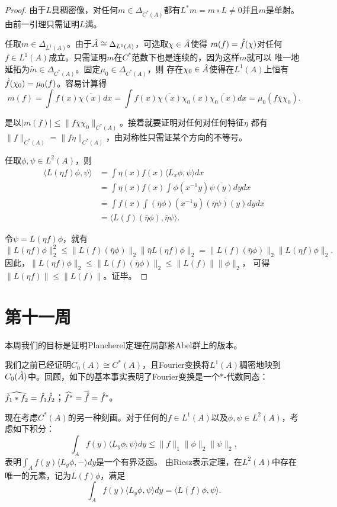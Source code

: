 \begin{proof}
    由于$L$具稠密像，对任何$m \in \Delta_{C^*(A)}$都有$L^*m = m \circ L \neq 0$并且$m$是单射。
    由前一引理只需证明$L$满。

    任取$m \in \Delta_{L^1(A)}$。由于$\hat{A} \cong \Delta_{L^1(A)}$，可选取$\chi \in \hat{A}$使得
    $m(f) = \hat{f}(\chi)$对任何$f \in L^1(A)$成立。只需证明$m$在$C^*$范数下也是连续的，因为这样$m$就可以
    唯一地延拓为$\tilde{m} \in \Delta_{C^*(A)}$。固定$\mu_0 \in \Delta_{C^*(A)}$，则
    存在$\chi_0 \in \hat{A}$使得在$L^1(A)$上恒有$\hat{f}(\chi_0) = \mu_0(f)$。容易计算得
    \[m(f) = \int f(x)\overline{\chi(x)} dx = \int f(x)\overline{\chi(x)}\chi_0(x)\overline{\chi_0(x)} dx = \mu_0(f\overline{\chi}\chi_0).\]

    是以$|m(f)| \leqslant \|f\overline{\chi}\chi_0\|_{C^*(A)}$。接着就要证明对任何对任何特征$\eta$
    都有$\|f\|_{C^*(A)} = \|f\eta\|_{C^*(A)}$，由对称性只需证某个方向的不等号。

    任取$\phi,\psi \in L^2(A)$，则
    \begin{align*}
        \langle L(\eta f)\phi,\psi \rangle & = \int \eta(x)f(x)\langle L_x\phi,\psi \rangle dx
        \\ & = \int \eta(x)f(x)\int \phi(x^{-1}y)\overline{\psi(y)}dydx
        \\ & = \int f(x)\int (\bar{\eta}\phi)(x^{-1}y)\overline{(\bar{\eta}\psi)(y)}dydx
        \\ & = \langle L(f)(\bar{\eta}\phi),\bar{\eta}\psi \rangle.
    \end{align*}

    令$\psi = L(\eta f)\phi$，就有
    \[\|L(\eta f)\phi\|_2^2 
    \leqslant \|L(f)(\bar{\eta}\phi)\|_2\|\bar{\eta}L(\eta f)\phi\|_2 
    = \|L(f)(\bar{\eta}\phi)\|_2\|L(\eta f)\phi\|_2.\]
    因此，$\|L(\eta f)\phi\|_2 \leqslant \|L(f)(\bar{\eta}\phi)\|_2 \leqslant \|L(f)\|\|\phi\|_2$，
    可得$\|L(\eta f)\| \leqslant \|L(f)\|$。证毕。
\end{proof}
\section{第十一周}
本周我们的目标是证明Plancherel定理在局部紧Abel群上的版本。

我们之前已经证明$C_0(A) \cong C^*(A)$，且Fourier变换将$L^1(A)$稠密地映到
$C_0(\hat{A})$中。回顾，如下的基本事实表明了Fourier变换是一个$*$-代数同态：
\begin{proposition}
$\widehat{f_1*f_2} = \hat{f}_1\hat{f}_2$；$\widehat{f^*} = \overline{\hat{f}} = \hat{f}^*$。
\end{proposition}
现在考虑$C^*(A)$的另一种刻画。对于任何的$f \in L^1(A)$以及$\phi,\psi \in L^2(A)$，考虑如下积分：
\[\int_A f(y)\langle L_y\phi,\psi \rangle dy \leqslant \|f\|_1\|\phi\|_2\|\psi\|_2,\]
表明$\displaystyle \int_A f(y)\langle L_y\phi,- \rangle dy$是一个有界泛函。
由Riesz表示定理，在$L^2(A)$中存在唯一的元素，记为$L(f)\phi$，满足\[\int_A f(y)\langle L_y\phi,\psi \rangle dy = \langle L(f)\phi,\psi \rangle.\]

